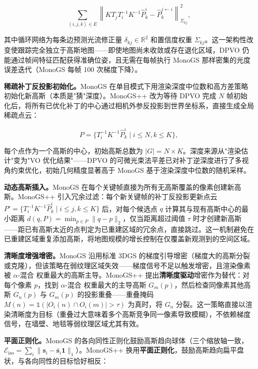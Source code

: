 \begin{equation*}
\sum_{(i,j,k) \in E} \left\| K T_j T_i^{-1} K^{-1} \hat{P}_k^i - \hat{P}_k^{j \leftarrow i} \right\|^2_{\Sigma_{kj}},
\end{equation*}

其中循环网络为每条边预测光流修正量 $\delta_{kj} \in \mathbb{R}^2$ 和置信度权重 $\Sigma_{kj}$。这一架构性改变使跟踪完全独立于高斯地图——即使地图尚未收敛或存在退化区域，DPVO 仍能通过帧间特征匹配获得准确位姿，且无需在每帧执行 MonoGS 那样密集的光度误差迭代（MonoGS 每帧 100 次梯度下降）。

\textbf{稀疏补丁反投影初始化。}MonoGS 在单目模式下用渲染深度中位数和高方差策略初始化新高斯（本质是"猜"深度）。MonoGS++ 改为等待 DPVO 完成 $N$ 帧初始化后，将所有已优化补丁的中心通过相机外参反投影到世界坐标系，直接生成全局稀疏点云：

\begin{equation*}
P = \{T_i^{-1}K^{-1}\hat{P}_k^i \mid i \leq N, k \leq K\},
\end{equation*}

每个点作为一个高斯的中心，初始高斯总数为 $|G| = N \times K$。深度来源从"渲染估计"变为"VO 优化结果"——DPVO 的可微光束法平差已对补丁逆深度进行了多视角约束优化，初始几何精度显著高于 MonoGS 基于渲染深度中位数的随机采样。

\textbf{动态高斯插入。}MonoGS 在每个关键帧直接为所有无高斯覆盖的像素创建新高斯。MonoGS++ 引入冗余过滤：每个新关键帧的补丁反投影更新点云 $P' = \{T_i^{-1}K^{-1}\hat{P}_k^i \mid i \leq j, k \leq K\}$ 后，对每个候选点 $q$ 计算其与现有高斯中心的最小距离 $d(q, P) = \min_{p \in P} \|q - p\|_2$，仅当距离超过阈值 $\tau$ 时才创建新高斯——距已有高斯太近的点判定为已重建区域的冗余点，直接跳过。这一机制避免在已重建区域重复添加高斯，将地图规模的增长控制在仅覆盖新观测到的空间区域。

\textbf{清晰度增强增密。}MonoGS 沿用标准 3DGS 的梯度引导增密（梯度大的高斯分裂或克隆），但该策略在弱纹理区域失效——梯度信号不足以触发增密，且渲染像素被 $\alpha$-混合 权重最大的高斯主导。MonoGS++ 提出\textbf{清晰度驱动}增密作为替代：对每个像素 $p$，找到 $\alpha$-混合 权重最大的主导高斯 $G_m(p)$，然后检查同像素其他高斯 $G_n(p)$ 与 $G_m(p)$ 的投影重叠——重叠掩码 $M(n) = \mathbb{1}(|O_i(n) \cap O_i(m)| > \tau)$ 为真时，将 $G_n$ 分裂。这一策略直接以渲染清晰度为目标（重叠过大意味着多个高斯竞争同一像素导致模糊），不依赖梯度信号，在墙壁、地毯等弱纹理区域尤其有效。

\textbf{平面正则化。}MonoGS 的各向同性正则化鼓励高斯趋向球体（三个缩放轴一致，$\mathcal{E}_{\mathrm{iso}} = \sum_i \| \mathbf{s}_i - \bar{\mathbf{s}}_i \mathbf{1} \|_1$）。MonoGS++ 换用\textbf{平面正则化}，鼓励高斯趋向扁平盘状，与各向同性的目标恰好相反：


